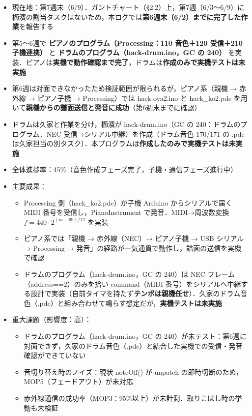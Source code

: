 \documentclass[a4paper,11pt]{ltjsarticle}
\providecommand{\％}{\%}
\begin{document}
\begin{itemize}
    \item 現在地：第7週末（6/9）．ガントチャート（§2.2）上，第7週（6/3〜6/9）に櫛濱の割当タスクはないため，本ログでは\textbf{第6週末（6/2）までに完了した作業}を報告する
    \item 第5〜6週で \textbf{ピアノのプログラム（Processing：110 音色＋120 受信＋210 子機連携）} と \textbf{ドラムのプログラム（hack-drum.ino，GC の 240）} を実装．ピアノは\textbf{実機で動作確認まで完了}，ドラムは\textbf{作成のみで実機テストは未実施}
    \item 第6週は対面できなかったため検証範囲が限られるが，ピアノ系（親機 → 赤外線 → ピアノ子機 → Processing）では hack-oya2.ino と hack\_ko2.pde を用いて\textbf{親機からの譜面送信と発音に成功}（第6週末までに確認）
    \item ドラムは久家と作業を分け，櫛濱が hack-drum.ino（GC の 240：ドラムのプログラム．NEC 受信→シリアル中継）を作成（ドラム音色 170/171 の .pde は久家担当の別タスク）．本プログラムは\textbf{作成したのみで実機テストは未実施}
    \item 全体進捗率：45\％（音色作成フェーズ完了，子機・通信フェーズ進行中）
    \item 主要成果：
    \begin{itemize}
        \item Processing 側（hack\_ko2.pde）が子機 Arduino からシリアルで届く MIDI 番号を受信し，PianoInstrument で発音．MIDI→周波数変換 $f=440\cdot2^{(m-69)/12}$ を実装
        \item ピアノ系では「親機 → 赤外線（NEC）→ ピアノ子機 → USB シリアル → Processing → 発音」の経路が一気通貫で動作し，譜面の送信を実機で確認
        \item ドラムのプログラム（hack-drum.ino，GC の 240）は NEC フレーム（address==2）のみを拾い command（MIDI 番号）をシリアルへ中継する設計で実装（自前タイマを持たず\textbf{テンポは親機任せ}）．久家のドラム音色（.pde）と組み合わせて鳴らす想定だが，\textbf{実機テストは未実施}
    \end{itemize}
    \item 重大課題（影響度：高）：
    \begin{itemize}
        \item ドラムのプログラム（hack-drum.ino，GC の 240）が未テスト：第6週に対面できず，久家のドラム音色（.pde）と結合した実機での受信・発音確認ができていない
        \item 音切り替え時のノイズ：現状 noteOff() が unpatch の即時切断のため，MOP5（フェードアウト）が未対応
        \item 赤外線通信の成功率（MOP3：95\％以上）が未計測．取りこぼし時の挙動も未検証
    \end{itemize}
\end{itemize}
\end{document}
